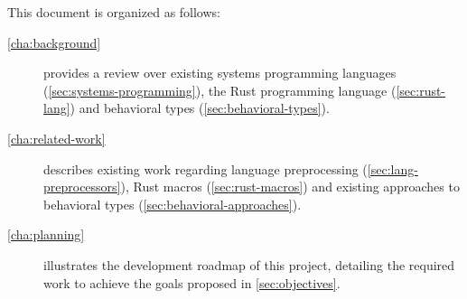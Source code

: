 This document is organized as follows:

\begin{description}
    \item[\autoref{cha:background}] provides a review over
          existing systems programming languages (\autoref{sec:systems-programming}),
          the Rust programming language (\autoref{sec:rust-lang}) and
          behavioral types (\autoref{sec:behavioral-types}).
    \item[\autoref{cha:related-work}] describes existing work regarding
          language preprocessing (\autoref{sec:lang-preprocessors}),
          Rust macros (\autoref{sec:rust-macros}) and
          existing approaches to behavioral types (\autoref{sec:behavioral-approaches}).
    \item[\autoref{cha:planning}] illustrates the development roadmap of this project,
          detailing the required work to achieve the goals proposed in \autoref{sec:objectives}.
\end{description}